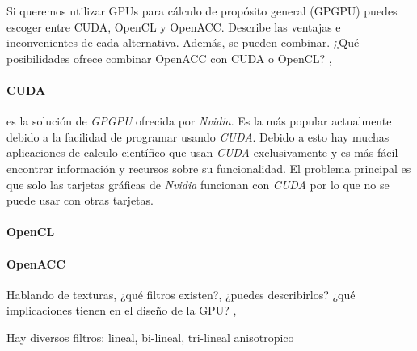 \begin{pregunta}{Si queremos utilizar GPUs para cálculo de propósito general (GPGPU)
    puedes escoger entre CUDA, OpenCL y OpenACC. Describe las ventajas e
    inconvenientes de cada alternativa.  Además, se pueden combinar. ¿Qué
posibilidades ofrece combinar OpenACC con CUDA o OpenCL?} \sep{}

\paragraph{CUDA} es la solución de \emph{GPGPU} ofrecida por \emph{Nvidia}. Es la más
popular actualmente debido a la facilidad de programar usando \emph{CUDA}. Debido a esto
hay muchas aplicaciones de calculo científico que usan \emph{CUDA} exclusivamente y es más fácil
encontrar información y recursos sobre su funcionalidad. El problema principal es que solo
las tarjetas gráficas de \emph{Nvidia} funcionan con \emph{CUDA} por lo que no se puede usar
con otras tarjetas. \cite{noauthor_cuda_2017}

\paragraph{OpenCL} \cite{noauthor_opencl_2013}

\paragraph{OpenACC} \cite{noauthor_about_nodate}

\end{pregunta}
\begin{pregunta}{Hablando de texturas, ¿qué filtros existen?, ¿puedes describirlos? ¿qué
implicaciones tienen en el diseño de la GPU?} \sep{}

Hay diversos filtros: lineal, bi-lineal, tri-lineal anisotropico

\cite{heckbert_survey_1986}

\end{pregunta}

